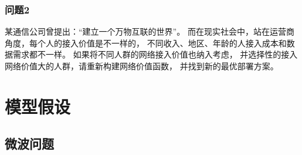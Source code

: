 \documentclass[UTF8,12pt]{ctexart}
\begin{document}
        \subsubsection{问题2}
            某通信公司曾提出：“建立一个万物互联的世界”。
            而在现实社会中，站在运营商角度，每个人的接入价值是不一样的，
            不同收入、地区、年龄的人接入成本和数据需求都不一样。
            如果将不同人群的网络接入价值也纳入考虑，
            并选择性的接入网络价值大的人群，请重新构建网络价值函数，
            并找到新的最优部署方案。
        



\section{模型假设}\label{mxjs}
    \subsection{微波问题}
\end{document}
